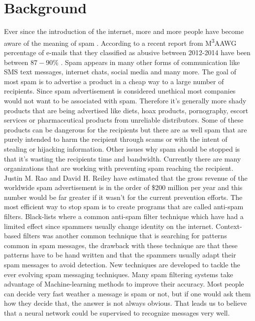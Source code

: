 
\section{Background}

Ever since the introduction of the internet, more and more people have become
aware of the meaning of spam .  According to a recent report from
M\textsuperscript{3}AAWG percentage of e-mails that they classified as abusive
between 2012-2014 have been between $87-90\%$ \cite{M3AAWG2014}. Spam appears
in many other forms of communication like SMS text messages, internet chats,
social media and many more.  The goal of most spam is to advertise a product in
a cheap way to a large number of recipients. Since spam advertisement is
considered unethical most companies would not want to be associated with spam.
Therefore it's generally more shady products that are being advertised like
diets, hoax products, pornography, escort services or pharmaceutical products
from unreliable distributors. Some of these products can be dangerous for the
recipients but there are as well spam that are purely intended to harm the
recipient through scams or with the intent of stealing or hijacking
information.  Other issues why spam should be stopped is that it's wasting the
recipients time and bandwidth. Currently there are many organizations that are
working with preventing spam reaching the recipient. Justin M. Rao and David
H. Reiley \cite{rao2012economics} have estimated that the gross revenue of the
worldwide spam advertisement is in the order of \$200 million per year and this
number would be far greater if it wasn't for the current prevention efforts.
The most efficient way to stop spam is to create programs that are called
anti-spam filters. Black-lists where a common anti-spam filter technique which
have had a limited effect since spammers usually change identity on the
internet. Context-based filters was another common technique that is searching
for patterns common in spam messages, the drawback with these technique are
that these patterns have to be hand written and that the spammers usually adapt
their spam messages to avoid detection. 
New techniques are developed to tackle the ever evolving spam messaging
techniques.\cite{spam-techniques}
Many spam filtering systems take advantage of Machine-learning methods to
improve their accuracy. Most people can decide very fast weather a message is
spam or not, but if one would ask them how they decide that, the answer is not
always obvious. That leads us to believe that a neural network could be
supervised to recognize messages very well. 
